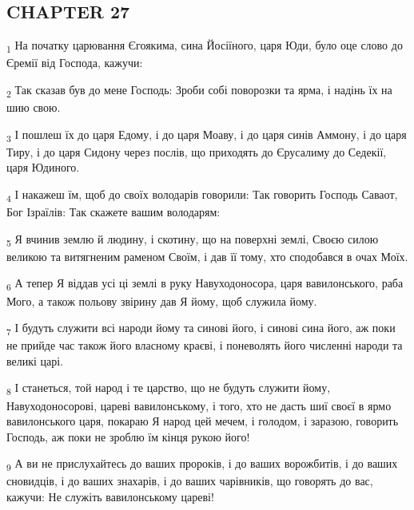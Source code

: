 \subsection{CHAPTER 27}
\begin{tcolorbox}
\textsubscript{1} На початку царювання Єгоякима, сина Йосіїного, царя Юди, було оце слово до Єремії від Господа, кажучи:
\end{tcolorbox}
\begin{tcolorbox}
\textsubscript{2} Так сказав був до мене Господь: Зроби собі поворозки та ярма, і надінь їх на шию свою.
\end{tcolorbox}
\begin{tcolorbox}
\textsubscript{3} І пошлеш їх до царя Едому, і до царя Моаву, і до царя синів Аммону, і до царя Тиру, і до царя Сидону через послів, що приходять до Єрусалиму до Седекії, царя Юдиного.
\end{tcolorbox}
\begin{tcolorbox}
\textsubscript{4} І накажеш їм, щоб до своїх володарів говорили: Так говорить Господь Саваот, Бог Ізраїлів: Так скажете вашим володарям:
\end{tcolorbox}
\begin{tcolorbox}
\textsubscript{5} Я вчинив землю й людину, і скотину, що на поверхні землі, Своєю силою великою та витягненим раменом Своїм, і дав її тому, хто сподобався в очах Моїх.
\end{tcolorbox}
\begin{tcolorbox}
\textsubscript{6} А тепер Я віддав усі ці землі в руку Навуходоносора, царя вавилонського, раба Мого, а також польову звірину дав Я йому, щоб служила йому.
\end{tcolorbox}
\begin{tcolorbox}
\textsubscript{7} І будуть служити всі народи йому та синові його, і синові сина його, аж поки не прийде час також його власному краєві, і поневолять його численні народи та великі царі.
\end{tcolorbox}
\begin{tcolorbox}
\textsubscript{8} І станеться, той народ і те царство, що не будуть служити йому, Навуходоносорові, цареві вавилонському, і того, хто не дасть шиї своєї в ярмо вавилонського царя, покараю Я народ цей мечем, і голодом, і заразою, говорить Господь, аж поки не зроблю їм кінця рукою його!
\end{tcolorbox}
\begin{tcolorbox}
\textsubscript{9} А ви не прислухайтесь до ваших пророків, і до ваших ворожбитів, і до ваших сновидців, і до ваших знахарів, і до ваших чарівників, що говорять до вас, кажучи: Не служіть вавилонському цареві!
\end{tcolorbox}
